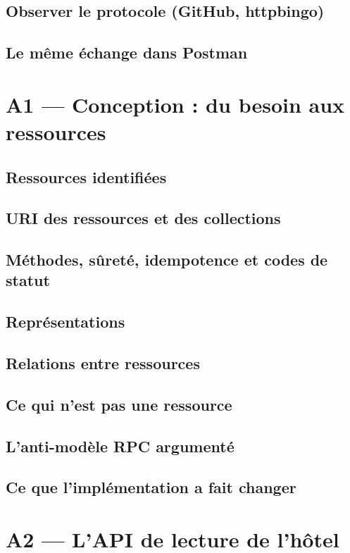 \documentclass[11pt,a4paper]{report}
\begin{document}
\section{Observer le protocole (GitHub, httpbingo)}
\section{Le même échange dans Postman}

\chapter{A1 --- Conception : du besoin aux ressources}
\section{Ressources identifiées}
\section{URI des ressources et des collections}
\section{Méthodes, sûreté, idempotence et codes de statut}
\section{Représentations}
\section{Relations entre ressources}
\section{Ce qui n'est pas une ressource}
\section{L'anti-modèle RPC argumenté}
\section{Ce que l'implémentation a fait changer}

\chapter{A2 --- L'API de lecture de l'hôtel}
\end{document}
